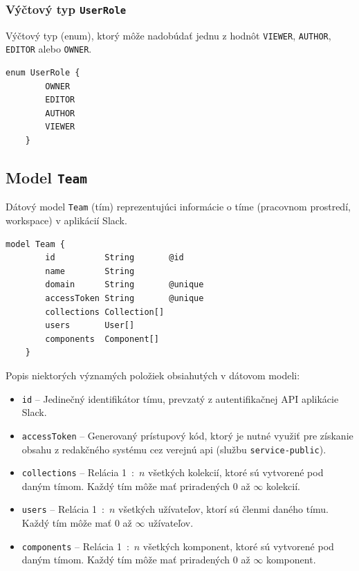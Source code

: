 \subsubsection{Výčtový typ \texttt{UserRole}}
Výčtový typ (enum), ktorý môže nadobúdať jednu z hodnôt \texttt{VIEWER}, \texttt{AUTHOR}, \texttt{EDITOR} alebo \texttt{OWNER}. \\

\begin{lstlisting}[caption=Výčtový typ \texttt{UserRole} v konfiguračnom súbore \texttt{prisma}.]
	enum UserRole {
		OWNER
		EDITOR
		AUTHOR
		VIEWER
	}
\end{lstlisting}

\subsection{Model \texttt{Team}}
Dátový model \texttt{Team} (tím) reprezentujúci informácie o tíme (pracovnom prostredí, workspace) v aplikácií Slack. \\

\begin{lstlisting}[caption=Dátový model \texttt{Team} v konfiguračnom súbore \texttt{prisma}.]
	model Team {
		id          String       @id
		name        String
		domain      String       @unique
		accessToken String       @unique
		collections Collection[]
		users       User[]
		components  Component[]
	}
\end{lstlisting}

\medskip

\noindent Popis niektorých významých položiek obsiahutých v dátovom modeli:

\begin{itemize}
	\item \texttt{id} -- Jedinečný identifikátor tímu, prevzatý z autentifikačnej API aplikácie Slack.
	\item \texttt{accessToken} -- Generovaný prístupový kód, ktorý je nutné využiť pre získanie obsahu z redakčného systému cez verejnú api (službu \texttt{service-public}). 
	\item \texttt{collections} -- Relácia 1~:~$n$ všetkých kolekcií, ktoré sú vytvorené pod daným tímom. Každý tím môže mať priradených 0 až $\infty$ kolekcií.
	\item \texttt{users} -- Relácia 1~:~$n$ všetkých užívateľov, ktorí sú členmi daného tímu. Každý tím môže mať 0 až $\infty$ užívateľov.
	\item \texttt{components} -- Relácia 1~:~$n$ všetkých komponent, ktoré sú vytvorené pod daným tímom. Každý tím môže mať priradených 0 až $\infty$ komponent.
\end{itemize}

